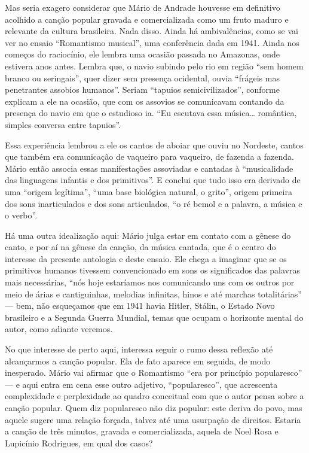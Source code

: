 Mas seria exagero considerar que Mário de Andrade houvesse em definitivo
acolhido a canção popular gravada e comercializada como um fruto maduro
e relevante da cultura brasileira. Nada disso. Ainda há ambivalências,
como se vai ver no ensaio ``Romantismo musical'', uma conferência dada
em 1941. Ainda nos começos do raciocínio, ele lembra uma ocasião passada
no Amazonas, onde estivera anos antes. Lembra que, o navio subindo pelo
rio em região ``sem homem branco ou seringais'', quer dizer sem presença
ocidental, ouvia ``frágeis mas penetrantes assobios humanos''. Seriam
``tapuios semicivilizados'', conforme explicam a ele na ocasião, que com
os assovios se comunicavam contando da presença do navio em que o
estudioso ia. ``Eu escutava essa música\ldots{} romântica, simples conversa
entre tapuios''.

Essa experiência lembrou a ele os cantos de aboiar que ouviu no
Nordeste, cantos que também era comunicação de vaqueiro para vaqueiro,
de fazenda a fazenda. Mário então associa essas manifestações assoviadas
e cantadas à ``musicalidade das linguagens infantis e dos primitivos''.
E conclui que tudo isso era derivado de uma ``origem legítima'', ``uma
base biológica natural, o grito'', origem primeira dos sons
inarticulados e dos sons articulados, ``o ré bemol e a palavra, a música
e o verbo''.

Há uma outra idealização aqui: Mário julga estar em contato com a gênese
do canto, e por aí na gênese da canção, da música cantada, que é o
centro do interesse da presente antologia e deste ensaio. Ele chega a
imaginar que se os primitivos humanos tivessem convencionado em sons os
significados das palavras mais necessárias, ``nós hoje estaríamos nos
comunicando uns com os outros por meio de árias e cantiguinhas, melodias
infinitas, hinos e até marchas totalitárias'' --- bem, não esqueçamos que
em 1941 havia Hitler, Stálin, o Estado Novo brasileiro e a Segunda
Guerra Mundial, temas que ocupam o horizonte mental do autor, como
adiante veremos.

No que interesse de perto aqui, interessa seguir o rumo dessa reflexão
até alcançarmos a canção popular. Ela de fato aparece em seguida, de
modo inesperado. Mário vai afirmar que o Romantismo ``era por princípio
popularesco'' --- e aqui entra em cena esse outro adjetivo,
``popularesco'', que acrescenta complexidade e perplexidade ao quadro
conceitual com que o autor pensa sobre a canção popular. Quem diz
popularesco não diz popular: este deriva do povo, mas aquele sugere uma
relação forçada, talvez até uma usurpação de direitos. Estaria a canção
de três minutos, gravada e comercializada, aquela de Noel Rosa e
Lupicínio Rodrigues, em qual dos casos?

